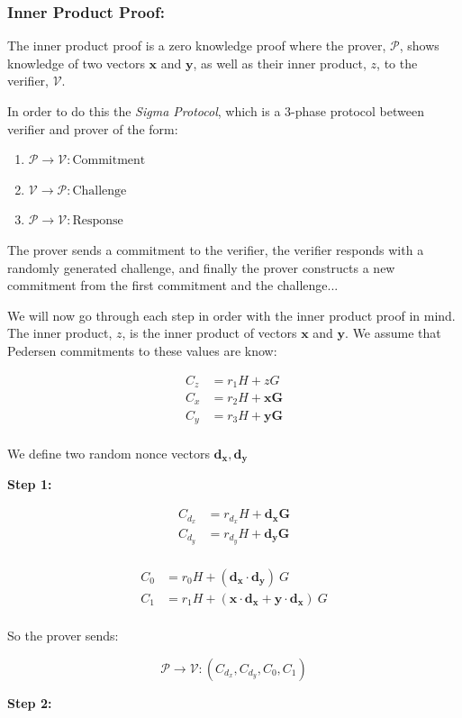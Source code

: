 \documentclass{article}
\newcommand{\eq}[1]{\begin{equation*}\begin{split}#1\end{split}\end{equation*}}
\renewcommand{\vec}[1]{\mathbf{#1}}
\newcommand{\V}{\mathcal{V}}
\renewcommand{\P}{\mathcal{P}}
\begin{document}
\subsubsection{Inner Product Proof:}

The inner product proof is a zero knowledge proof where the prover,
$\mathcal{P}$, shows knowledge of two vectors $\vec{x}$ and $\vec{y}$,
as well as their inner product, $z$, to the verifier, $\mathcal{V}$.

In order to do this the \textit{Sigma Protocol}, which is a 3-phase
protocol between verifier and prover of the form:

\begin{enumerate}
	\item $\P \rightarrow \V: \text{Commitment}$
	\item $\V \rightarrow \P: \text{Challenge}$
	\item $\P \rightarrow \V: \text{Response}$
\end{enumerate}

The prover sends a commitment to the verifier, the verifier responds with a randomly generated challenge, and finally the prover constructs a new commitment from the first commitment and the challenge... 

We will now go through each step in order with the inner product proof
in mind. The inner product, $z$, is the inner product of vectors
$\vec{x}$ and $\vec{y}$. We assume that Pedersen
commitments to these values are know:

\eq{
	C_z &= r_1 H + zG \\
	C_x &= r_2 H + \vec{xG} \\
	C_y &= r_3 H + \vec{yG} \\
}

We define two random nonce vectors $\vec{d_x}, \vec{d_y}$

\textbf{Step 1:}

\eq{
	C_{d_x} &= r_{d_x} H + \vec{d_x G} \\ 
	C_{d_y} &= r_{d_y} H + \vec{d_y G} \\
}

\eq{
	C_{0} &= r_{0} H + (\vec{d_x \cdot d_y})\ G \\
	C_{1} &= r_{1} H + (\vec{x \cdot d_x} + \vec{y \cdot d_x})\ G \\ 
}

So the prover sends:

$$\P \rightarrow \V: (C_{d_x}, C_{d_y}, C_0, C_1)$$

\textbf{Step 2:}
\end{document}
